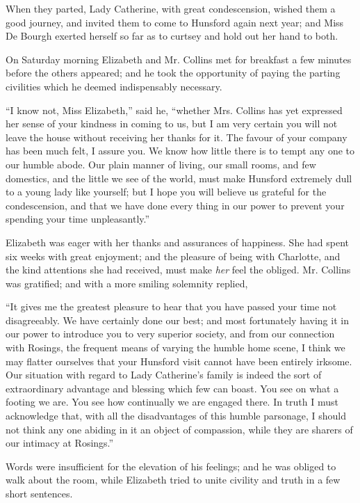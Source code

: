When they parted, Lady Catherine, with great condescension,
wished them a good journey, and invited them
to come to Hunsford again next year; and Miss De Bourgh
exerted herself so far as to curtsey and hold out her hand
to both.


On Saturday morning Elizabeth and Mr. Collins met
for breakfast a few minutes before the others appeared;
and he took the opportunity of paying the parting civilities
which he deemed indispensably necessary.

“I know not, Miss Elizabeth,” said he, “whether
Mrs. Coll\-ins has yet expressed her sense of your kindness
in coming to us, but I am very certain you will not leave
the house without receiving her thanks for it. The favour
of your company has been much felt, I assure you. We
know how little there is to tempt any one to our humble
abode. Our plain manner of living, our small rooms, and
few domestics, and the little we see of the world, must
make Hunsford extremely dull to a young lady like yourself;
but I hope you will believe us grateful for the
condescension, and that we have done every thing in our
power to prevent your spending your time unpleasantly.”

Elizabeth was eager with her thanks and assurances of
happiness. She had spent six weeks with great enjoyment;
and the pleasure of being with Charlotte, and the kind
attentions she had received, must make \textit{her} feel the obliged.
Mr. Collins was gratified; and with a more smiling
solemnity replied,

“It gives me the greatest pleasure to hear that you
have passed your time not disagreeably. We have
certainly done our best; and most fortunately having it
in our power to introduce you to very superior society,
and from our connection with Rosings, the frequent means
of varying the humble home scene, I think we may flatter
ourselves that your Hunsford visit cannot have been
entirely irksome. Our situation with regard to Lady
Catherine’s family is indeed the sort of extraordinary
advantage and blessing which few can boast. You see
on what a footing we are. You see how continually we are
engaged there. In truth I must acknowledge that, with
all the disadvantages of this humble parsonage, I should
not think any one abiding in it an object of compassion,
while they are sharers of our intimacy at Rosings.”

Words were insufficient for the elevation of his feelings;
and he was obliged to walk about the room, while Elizabeth
tried to unite civility and truth in a few short
sentences.

